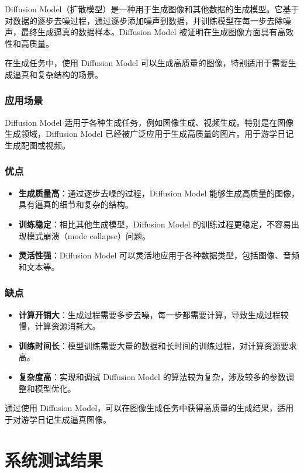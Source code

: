 \documentclass{ctexart}
\begin{document}
Diffusion Model（扩散模型）是一种用于生成图像和其他数据的生成模型。它基于对数据的逐步去噪过程，通过逐步添加噪声到数据，并训练模型在每一步去除噪声，最终生成逼真的数据样本。Diffusion Model 被证明在生成图像方面具有高效性和高质量。

在生成任务中，使用 Diffusion Model 可以生成高质量的图像，特别适用于需要生成逼真和复杂结构的场景。

\subsubsection{应用场景}

Diffusion Model 适用于各种生成任务，例如图像生成、视频生成。特别是在图像生成领域，Diffusion Model 已经被广泛应用于生成高质量的图片。用于游学日记生成配图或视频。

\subsubsection{优点}

\begin{itemize}
\item \textbf{生成质量高}：通过逐步去噪的过程，Diffusion Model 能够生成高质量的图像，具有逼真的细节和复杂的结构。
\item \textbf{训练稳定}：相比其他生成模型，Diffusion Model 的训练过程更稳定，不容易出现模式崩溃（mode collapse）问题。
\item \textbf{灵活性强}：Diffusion Model 可以灵活地应用于各种数据类型，包括图像、音频和文本等。
\end {itemize}

\subsubsection {缺点}

\begin{itemize}
    \item \textbf{计算开销大}：生成过程需要多步去噪，每一步都需要计算，导致生成过程较慢，计算资源消耗大。
    \item \textbf{训练时间长}：模型训练需要大量的数据和长时间的训练过程，对计算资源要求高。
    \item \textbf{复杂度高}：实现和调试 Diffusion Model 的算法较为复杂，涉及较多的参数调整和模型优化。
\end{itemize}

通过使用 Diffusion Model，可以在图像生成任务中获得高质量的生成结果，适用于对游学日记生成逼真图像。

\section{系统测试结果}
\end{document}
